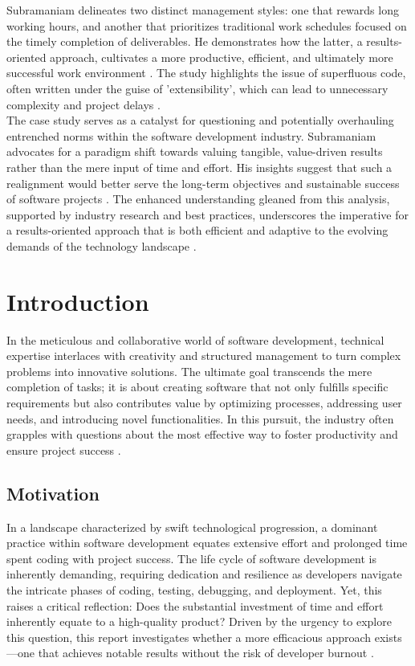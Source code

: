 \documentclass{article}
\begin{document}
Subramaniam delineates two distinct management styles: one that rewards long working hours, and another that prioritizes traditional work schedules focused on the timely completion of deliverables. He demonstrates how the latter, a results-oriented approach, cultivates a more productive, efficient, and ultimately more successful work environment \cite{Verbeeten2015}. The study highlights the issue of superfluous code, often written under the guise of 'extensibility', which can lead to unnecessary complexity and project delays \cite{WagnerDeissenboeck2019}.\\

The case study serves as a catalyst for questioning and potentially overhauling entrenched norms within the software development industry. Subramaniam advocates for a paradigm shift towards valuing tangible, value-driven results rather than the mere input of time and effort. His insights suggest that such a realignment would better serve the long-term objectives and sustainable success of software projects \cite{FayadSchmidt1997}. The enhanced understanding gleaned from this analysis, supported by industry research and best practices, underscores the imperative for a results-oriented approach that is both efficient and adaptive to the evolving demands of the technology landscape \cite{Trendowicz2009, BudacuPocatilu2018}.

\newpage

\section{Introduction}
In the meticulous and collaborative world of software development, technical expertise interlaces with creativity and structured management to turn complex problems into innovative solutions. The ultimate goal transcends the mere completion of tasks; it is about creating software that not only fulfills specific requirements but also contributes value by optimizing processes, addressing user needs, and introducing novel functionalities. In this pursuit, the industry often grapples with questions about the most effective way to foster productivity and ensure project success \cite{Trendowicz2009}.

\subsection{Motivation}
In a landscape characterized by swift technological progression, a dominant practice within software development equates extensive effort and prolonged time spent coding with project success. The life cycle of software development is inherently demanding, requiring dedication and resilience as developers navigate the intricate phases of coding, testing, debugging, and deployment. Yet, this raises a critical reflection: Does the substantial investment of time and effort inherently equate to a high-quality product? Driven by the urgency to explore this question, this report investigates whether a more efficacious approach exists—one that achieves notable results without the risk of developer burnout \cite{Carmichael2015, SinghSuarLeiter2012}.
\end{document}
